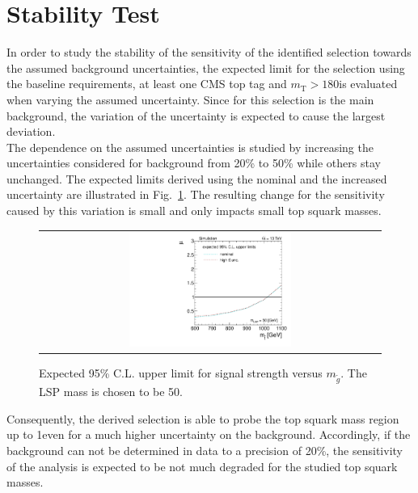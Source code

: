 \section{Stability Test}
\label{sec:stop_syst}
In order to study the stability of the sensitivity of the identified selection towards the assumed background uncertainties, the expected limit for the selection using the baseline requirements, at least one CMS top tag and $m_\mathrm{T} > 180$\gev is evaluated when varying the assumed \ttbar uncertainty. Since for this selection \ttbar is the main background, the variation of the \ttbar uncertainty is expected to cause the largest deviation. \\
The dependence on the assumed uncertainties is studied by increasing the uncertainties considered for \ttbar background from 20\% to 50\% while others stay unchanged. The expected limits derived using the nominal and the increased \ttbar uncertainty are illustrated in Fig.~\ref{fig:stop_varied_limit}. The resulting change for the sensitivity caused by this variation is small and only impacts small top squark masses.      
\begin{figure}[!t]
  \centering
  \begin{tabular}{c}
                \includegraphics[width=0.49\textwidth]{figures/limitplot4BinSel_SystVariation_LSP50.pdf} 
  \end{tabular}
  \caption{Expected 95\% C.L. upper limit for signal strength versus $m_{\tilde{g}}$. The LSP mass is chosen to be 50\gev.}
  \label{fig:stop_varied_limit}
\end{figure}
Consequently, the derived selection is able to probe the top squark mass region up to 1\tev even for a much higher uncertainty on the \ttbar background. Accordingly, if the \ttbar background can not be determined in data to a precision of 20\%, the sensitivity of the analysis is expected to be not much degraded for the studied top squark masses.              

